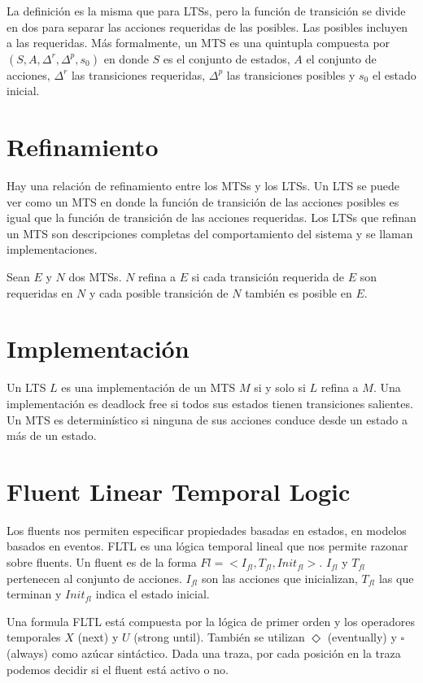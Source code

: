 \vspace{\baselineskip}
La definición es la misma que para LTSs, pero la función de transición se divide en dos para separar las acciones
requeridas de las posibles. Las posibles incluyen a las requeridas.
Más formalmente, un MTS es una quintupla compuesta por $(S, A, \Delta^r, \Delta^p, s_{0})$ en donde $S$ es el
conjunto de estados, $A$ el conjunto de acciones, $\Delta^r$ las transiciones requeridas, $\Delta^p$  las
transiciones posibles y $s_{0}$ el estado inicial.

\section{Refinamiento}

Hay una relación de refinamiento entre los MTSs y los LTSs. Un LTS se puede ver como un MTS en donde la función de
transición de las acciones posibles es igual que la función de transición de las acciones requeridas. Los LTSs que
refinan un MTS son descripciones completas del comportamiento del sistema y se llaman implementaciones.

\vspace{\baselineskip}
Sean $E$ y $N$ dos MTSs. $N$ refina a $E$ si cada transición requerida de $E$ son requeridas en $N$ y cada posible
transición de $N$ también es posible en $E$.

\section{Implementación}

Un LTS $L$ es una implementación de un MTS $M$ si y solo si $L$ refina a $M$. Una implementación es deadlock free
si todos sus estados tienen transiciones salientes. Un MTS es determinístico si ninguna de sus acciones conduce
desde un estado a más de un estado.

\section{Fluent Linear Temporal Logic}
Los fluents nos permiten especificar propiedades basadas en estados, en modelos basados en eventos. FLTL es una
lógica temporal lineal que nos permite razonar sobre fluents. Un fluent es de la forma $Fl = <I_{fl}, T_{fl}, Init_{fl}>$.
$I_{fl}$ y $T_{fl}$ pertenecen al conjunto de acciones. $I_{fl}$ son las acciones que inicializan, $T_{fl}$ las que
terminan y $Init_{fl}$ indica el estado inicial.

\vspace{\baselineskip}
Una formula FLTL está compuesta por la lógica de primer orden y los operadores temporales $X$ (next) y $U$ (strong until).
También se utilizan $\Diamond$ (eventually) y $\square$ (always) como azúcar sintáctico.
Dada una traza, por cada posición en la traza podemos decidir si el fluent está activo o no.

